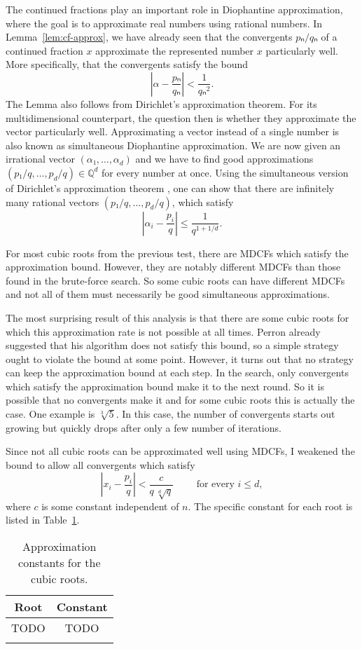 The continued fractions play an important role in Diophantine approximation,
where the goal is to approximate real numbers using rational numbers.
In Lemma~\vref{lem:cf-approx}, we have already seen that the convergents
$pₙ/qₙ$ of a continued fraction $x$ approximate the represented number $x$
particularly well.
More specifically, that the convergents satisfy the bound
\[
  \left|α - \frac{pₙ}{qₙ}\right| < \frac{1}{qₙ^2}.
\]
The Lemma also follows from Dirichlet's approximation theorem.
For its multidimensional counterpart,
the question then is whether they approximate the vector particularly well.
Approximating a vector instead of a single number is also known as simultaneous
Diophantine approximation.
We are now given an irrational vector $(α₁, …, α_d)$ and we have to find good
approximations $(p₁/q, …, p_d/q) ∈ ℚ^d$ for every number at once.
Using the simultaneous version of Dirichlet's approximation theorem \cite{Schmidt80},
one can show that there are infinitely many rational vectors $(p₁/q, …, p_d/q)$,
which satisfy
\[
  \left|α_i - \frac{p_i}{q}\right| ≤ \frac{1}{q^{1 + 1/d}}.
\]

For most cubic roots from the previous test,
there are MDCFs which satisfy the approximation bound.
However, they are notably different MDCFs than those found in the brute-force
search.
So some cubic roots can have different MDCFs
and not all of them must necessarily be good simultaneous approximations.

The most surprising result of this analysis is that there are some cubic roots
for which this approximation rate is not possible at all times.
Perron already suggested that his algorithm does not satisfy this bound,
so a simple strategy ought to violate the bound at some point.
However, it turns out that no strategy can keep the approximation bound at each step.
In the search, only convergents which satisfy the approximation bound make it to the next round.
So it is possible that no convergents make it and for some cubic roots this is actually the case.
One example is $\sqrt[3]{5}$.
In this case, the number of convergents starts out growing but quickly drops
after only a few number of iterations.

Since not all cubic roots can be approximated well using MDCFs,
I weakened the bound to allow all convergents which satisfy
\[
  \left|x_i - \frac{p_i}{q}\right| < \frac{c}{q \, \sqrt[d]{q}} \qquad \text{ for every } i ≤ d,
\]
where $c$ is some constant independent of $n$.
The specific constant for each root is listed in Table~\ref{tbl:approx-const}.
\begin{table}[tbp]
  \centering
  \begin{tabular}{cc}
    \uzlhline
    Root & Constant \\
    \hline
    TODO & TODO \\
    \uzlhline
  \end{tabular}
  \caption{Approximation constants for the cubic roots.}
  \label{tbl:approx-const}
\end{table}

